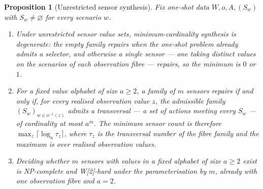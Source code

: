 \documentclass[11pt]{article}
\theoremstyle{plain}
\newtheorem{proposition}[theorem]{Proposition}
\theoremstyle{definition}
\theoremstyle{remark}
\begin{document}
\begin{proposition}[Unrestricted sensor synthesis]
\label{prop:unrestricted-synthesis}
Fix one-shot data \(W,o,A,(S_w)\) with \(S_w\ne\varnothing\) for every
scenario \(w\).
\begin{enumerate}
\item Under unrestricted sensor value sets, minimum-cardinality synthesis is
degenerate: the empty family repairs when the one-shot problem already admits
a selector, and otherwise a single sensor --- one taking distinct values on
the scenarios of each observation fibre --- repairs, so the minimum is \(0\)
or \(1\).
\item For a fixed value alphabet of size \(a\ge2\), a family of \(m\)
sensors repairs if and only if, for every realised observation value \(z\),
the admissible family \((S_w)_{w\in o^{-1}(z)}\) admits a transversal --- a
set of actions meeting every \(S_w\) --- of cardinality at most \(a^m\).
The minimum sensor count is therefore
\(\max_z\lceil\log_a\tau_z\rceil\), where \(\tau_z\) is the transversal
number of the fibre family and the maximum is over realised observation
values.
\item Deciding whether \(m\) sensors with values in a fixed alphabet of size
\(a\ge2\) exist is NP-complete and W[2]-hard under the parameterisation by
\(m\), already with one observation fibre and \(a=2\).
\end{enumerate}
\end{proposition}
\end{document}
